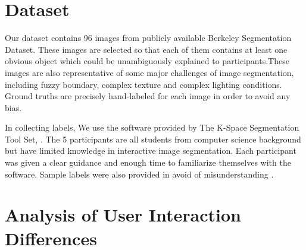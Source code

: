 \documentclass[runningheads,a4paper]{llncs}
\begin{document}
\section{Dataset}
Our dataset contains 96 images from publicly available Berkeley Segmentation Dataset\cite{martin2001database}. These images are selected so that each of them contains at least one obvious object which could be unambiguously explained to participants.These images are also representative of some major challenges of image segmentation, including fuzzy boundary, complex texture and complex lighting conditions. Ground truths are precisely hand-labeled for each image in order to avoid any bias.

In collecting labels, We use the software provided by The K-Space Segmentation Tool Set, \cite{mcguinness2008k}. The 5 participants are all students from computer science background but have limited knowledge in interactive image segmentation. Each participant was given a clear guidance and enough time to familiarize themselves with the software. Sample labels were also provided in avoid of misunderstanding . 


\section{Analysis of User Interaction Differences}
\end{document}
